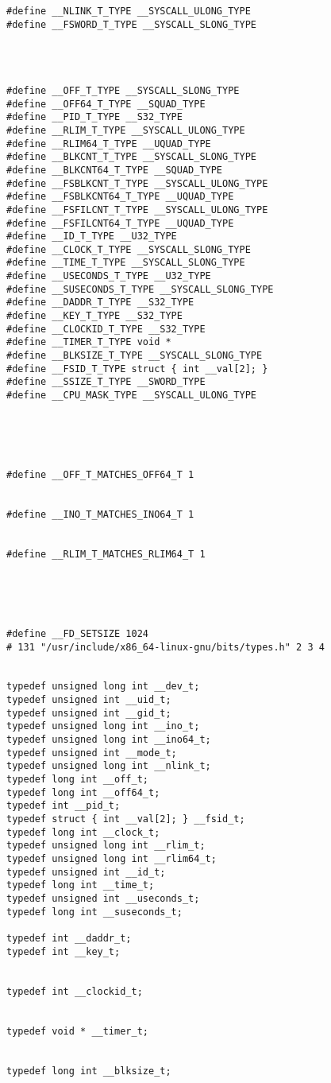 \documentclass[11pt]{article}
\begin{document}
\begin{enumerate}
\begin{verbatim}
#define __NLINK_T_TYPE __SYSCALL_ULONG_TYPE
#define __FSWORD_T_TYPE __SYSCALL_SLONG_TYPE




#define __OFF_T_TYPE __SYSCALL_SLONG_TYPE
#define __OFF64_T_TYPE __SQUAD_TYPE
#define __PID_T_TYPE __S32_TYPE
#define __RLIM_T_TYPE __SYSCALL_ULONG_TYPE
#define __RLIM64_T_TYPE __UQUAD_TYPE
#define __BLKCNT_T_TYPE __SYSCALL_SLONG_TYPE
#define __BLKCNT64_T_TYPE __SQUAD_TYPE
#define __FSBLKCNT_T_TYPE __SYSCALL_ULONG_TYPE
#define __FSBLKCNT64_T_TYPE __UQUAD_TYPE
#define __FSFILCNT_T_TYPE __SYSCALL_ULONG_TYPE
#define __FSFILCNT64_T_TYPE __UQUAD_TYPE
#define __ID_T_TYPE __U32_TYPE
#define __CLOCK_T_TYPE __SYSCALL_SLONG_TYPE
#define __TIME_T_TYPE __SYSCALL_SLONG_TYPE
#define __USECONDS_T_TYPE __U32_TYPE
#define __SUSECONDS_T_TYPE __SYSCALL_SLONG_TYPE
#define __DADDR_T_TYPE __S32_TYPE
#define __KEY_T_TYPE __S32_TYPE
#define __CLOCKID_T_TYPE __S32_TYPE
#define __TIMER_T_TYPE void *
#define __BLKSIZE_T_TYPE __SYSCALL_SLONG_TYPE
#define __FSID_T_TYPE struct { int __val[2]; }
#define __SSIZE_T_TYPE __SWORD_TYPE
#define __CPU_MASK_TYPE __SYSCALL_ULONG_TYPE





#define __OFF_T_MATCHES_OFF64_T 1


#define __INO_T_MATCHES_INO64_T 1


#define __RLIM_T_MATCHES_RLIM64_T 1





#define __FD_SETSIZE 1024
# 131 "/usr/include/x86_64-linux-gnu/bits/types.h" 2 3 4


typedef unsigned long int __dev_t;
typedef unsigned int __uid_t;
typedef unsigned int __gid_t;
typedef unsigned long int __ino_t;
typedef unsigned long int __ino64_t;
typedef unsigned int __mode_t;
typedef unsigned long int __nlink_t;
typedef long int __off_t;
typedef long int __off64_t;
typedef int __pid_t;
typedef struct { int __val[2]; } __fsid_t;
typedef long int __clock_t;
typedef unsigned long int __rlim_t;
typedef unsigned long int __rlim64_t;
typedef unsigned int __id_t;
typedef long int __time_t;
typedef unsigned int __useconds_t;
typedef long int __suseconds_t;

typedef int __daddr_t;
typedef int __key_t;


typedef int __clockid_t;


typedef void * __timer_t;


typedef long int __blksize_t;





\end{verbatim}
\end{enumerate}
\end{document}
